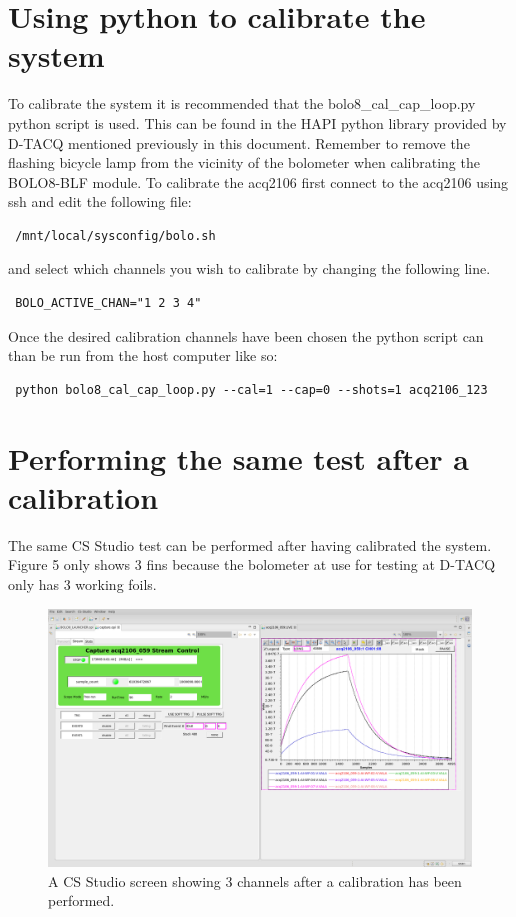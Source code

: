 \documentclass{article}
\begin{document}
\newpage

\section{Using python to calibrate the system}
To calibrate the system it is recommended that the bolo8\_cal\_cap\_loop.py python script is used.
This can be found in the HAPI python library provided by D-TACQ mentioned previously in this document.
Remember to remove the flashing bicycle lamp from the vicinity of the bolometer when calibrating the BOLO8-BLF module.
\newline
To calibrate the acq2106 first connect to the acq2106 using ssh and edit the following file:

\begin{verbatim} /mnt/local/sysconfig/bolo.sh \end{verbatim}

and select which channels you wish to calibrate by changing the following line.

\begin{verbatim} BOLO_ACTIVE_CHAN="1 2 3 4" \end{verbatim}

Once the desired calibration channels have been chosen the python script can than be run from the host computer like so:

\begin{verbatim} python bolo8_cal_cap_loop.py --cal=1 --cap=0 --shots=1 acq2106_123\end{verbatim}

\newpage

\section{Performing the same test after a calibration}
The same CS Studio test can be performed after having calibrated the system.
Figure 5 only shows 3 fins because the bolometer at use for testing at D-TACQ only has 3 working foils.

\begin{figure}
	\centering
	\includegraphics[width=5.0in]{images/3-fins.png}
	\caption{A CS Studio screen showing 3 channels after a calibration has been performed.}
	\label{boloZIFimage}
\end{figure}
\end{document}

